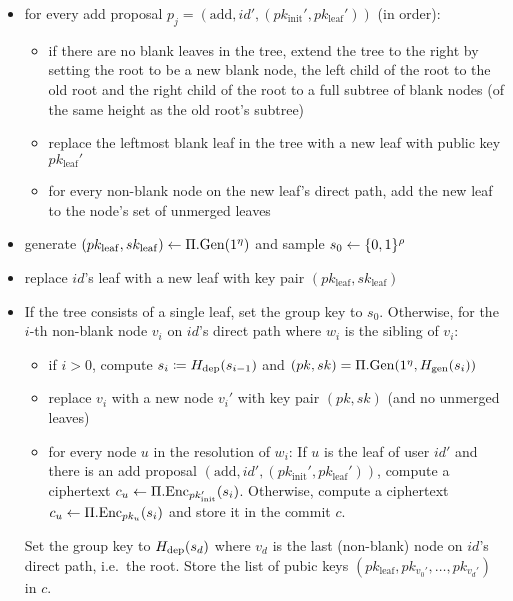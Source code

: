 \begin{definition}
\begin{itemize}
\begin{itemize}
\begin{itemize}
			            \end{itemize}
			      \item for every add proposal $p_j = (\mathrm{add}, id', (pk_{\mathrm{init}}', pk_{\mathrm{leaf}}'))$ (in order):
			            \begin{itemize}
				            \item if there are no blank leaves in the tree, extend the tree to the right by setting the root to be a new blank node, the left child of the root to the old root and the right child of the root to a full subtree of blank nodes (of the same height as the old root's subtree)
				            \item replace the leftmost blank leaf in the tree with a new leaf with public key $pk_{\mathrm{leaf}}'$
				            \item for every non-blank node on the new leaf's direct path, add the new leaf to the node's set of unmerged leaves
			            \end{itemize}
			      \item generate $(pk_{\mathrm{leaf}}, sk_{\mathrm{leaf}}) \leftarrow \Pi.\mathrm{Gen}(1^\eta)$ and sample $s_0 \leftarrow \{0, 1\}^\rho$
			      \item replace $id$'s leaf with a new leaf with key pair $(pk_{\mathrm{leaf}}, sk_{\mathrm{leaf}})$
			      \item If the tree consists of a single leaf, set the group key to $s_0$. Otherwise, for the $i$-th non-blank node $v_i$ on $id$'s direct path where $w_i$ is the sibling of $v_i$:
			            \begin{itemize}
				            \item if $i > 0$, compute $s_i \coloneqq H_\mathrm{dep}(s_{i - 1})$ and $(pk, sk) = \Pi.\mathrm{Gen}(1^\eta, H_\mathrm{gen}(s_i))$
				            \item replace $v_i$ with a new node $v_i'$ with key pair $(pk, sk)$ (and no unmerged leaves)
				            \item for every node $u$ in the resolution of $w_i$: If $u$ is the leaf of user $id'$ and there is an add proposal $(\mathrm{add}, id', (pk_{\mathrm{init}}', pk_{\mathrm{leaf}}'))$, compute a ciphertext $c_u \leftarrow \Pi.\mathrm{Enc}_{pk_{\mathrm{init}}'}(s_i)$. Otherwise, compute a ciphertext $c_u \leftarrow \Pi.\mathrm{Enc}_{pk_u}(s_i)$ and store it in the commit $c$.
			            \end{itemize}
			            Set the group key to $H_\mathrm{dep}(s_d)$ where $v_d$ is the last (non-blank) node on $id$'s direct path, i.e.\ the root. Store the list of pubic keys $(pk_{\mathrm{leaf}}, pk_{v_0'}, \ldots, pk_{v_d'})$ in $c$.

\end{itemize}
\end{itemize}
\end{definition}
